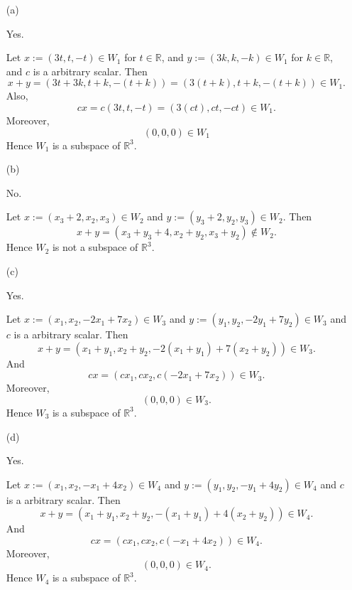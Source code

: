 \begin{Exercise} \label{ex:1.3.8}
	\begin{enumerate}[(a)]
		\item[(a)]
		\begin{answer}
			Yes.
		\end{answer}
		\begin{solution}
			Let $x := (3t,t,-t)\in W_1$ for $t\in\mathbb{R}$, and $y := (3k,k,-k)\in W_1$ for $k\in\mathbb{R}$, and $c$ is a  arbitrary scalar. 
			Then
			$$
			x+y
			= (3t+3k,t+k,-(t+k))
			= (3(t+k), t+k, -(t+k)) \in W_1.
			$$
			Also,
			$$
			c x
			= c(3t,t,-t)
			= (3(ct),ct,-ct) \in W_1.
			$$
			Moreover,
			$$
			(0,0,0) \in W_1
			$$
			Hence $W_1$ is a subspace of $\mathbb{R}^3$.
		\end{solution}
		
		\item[(b)]
		\begin{answer}
			No.
		\end{answer}
		\begin{solution}
			Let $x := (x_3+2,x_2,x_3)\in W_2$ and $y := (y_3+2,y_2,y_3)\in W_2$. 
			Then
			$$
			x+y
			= (x_3+y_3+4, x_2+y_2,x_3+y_2) \notin W_2.
			$$
			Hence $W_2$ is not a subspace of $\mathbb{R}^3$.
		\end{solution}
		
		\item[(c)]
		\begin{answer}
			Yes.
		\end{answer}
		\begin{solution}
			Let $x := (x_1,x_2,-2x_1+7x_2)\in W_3$ and $y := (y_1,y_2,-2y_1+7y_2)\in W_3$ and $c$ is a arbitrary scalar. Then
			$$
			x+y
			= (x_1+y_1, x_2+y_2, -2(x_1+y_1)+7(x_2+y_2)) \in W_3.
			$$
			And
			$$
			c x
			= (c x_1, c x_2, c(-2 x_1 + 7x_2)) \in W_3.
			$$
			Moreover,
			$$
			(0,0,0) \in W_3.
			$$
			Hence $W_3$ is a subspace of $\mathbb{R}^3$.
		\end{solution}
		
		\item[(d)]
		\begin{answer}
			Yes.
		\end{answer}
		\begin{solution}
			Let $x := (x_1,x_2,-x_1+4x_2)\in W_4$ and $y := (y_1,y_2,-y_1+4y_2)\in W_4$ and $c$ is a arbitrary scalar. Then
			$$
			x+y
			= (x_1+y_1, x_2+y_2, -(x_1+y_1)+4(x_2+y_2)) \in W_4.
			$$
			And
			$$
			c x
			= (c x_1, c x_2, c(- x_1 + 4x_2)) \in W_4.
			$$
			Moreover,
			$$
			(0,0,0) \in W_4.
			$$
			Hence $W_4$ is a subspace of $\mathbb{R}^3$.
		\end{solution}
		

\end{enumerate}
\end{Exercise}
